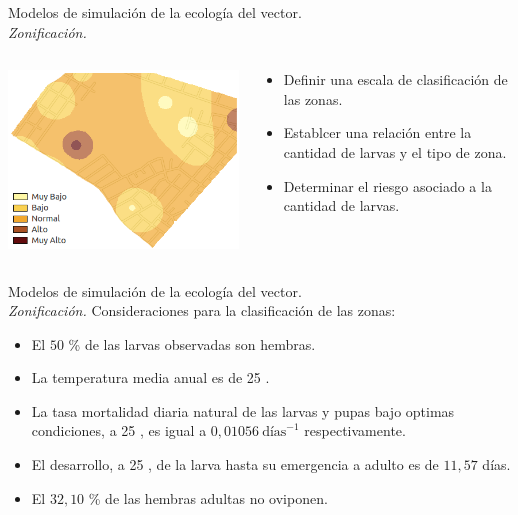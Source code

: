 \begin{frame}[c]{Modelos de simulación de la ecología del vector.\\\textit{Zonificación.}}
  \begin{center}
   \begin{columns}[T]
        \begin{column}[T]{5cm}
			\includegraphics[width=\textwidth]{./graphics/zonificacion-intro.png}
        \end{column}
        \begin{column}[T]{6cm}
          \begin{itemize}
          \item Definir una escala de clasificación de las zonas.
          \item Establcer una relación entre la cantidad de larvas y el tipo de zona.
          \item Determinar el riesgo asociado a la cantidad de larvas.
          \end{itemize}
        \end{column}
    \end{columns}
  \end{center}
\end{frame}

\begin{frame}[c]{Modelos de simulación de la ecología del vector.\\\textit{Zonificación.}}
  Consideraciones para la clasificación de las zonas:
  \begin{itemize}
      \item El $50$ \% de las larvas observadas son hembras.
      \item La temperatura media anual es de 25 \textcelsius.
      \item La tasa mortalidad diaria natural de las larvas y pupas bajo optimas condiciones, a 25 \textcelsius, es igual a $0,01056\ \text{días}^{-1}$ respectivamente.
      \item El desarrollo, a 25 \textcelsius, de la larva hasta su emergencia a adulto es de $11,57$ días.
      \item El $32,10$ \% de las hembras adultas no oviponen.
  \end{itemize}
\end{frame}

